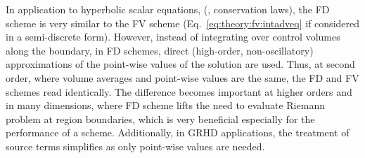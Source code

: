 %

In application to hyperbolic scalar equations, (\eg, conservation laws), the \ac{FD} scheme is very similar to the \ac{FV} scheme 
(Eq.~\eqref{eq:theory:fv:intadveq} if considered in a 
semi-discrete form).
However, instead of integrating over control volumes along the boundary, 
in \ac{FD} schemes, direct (high-order, non-oscillatory) approximations 
of the point-wise values of the solution are used.
Thus, at second order, where volume averages and point-wise values are the same,
the \ac{FD} and \ac{FV} schemes read identically.
The difference becomes important at higher orders and in many dimensions, 
where \ac{FD} scheme lifts the need to evaluate Riemann problem at region boundaries,
which is very beneficial especially for the performance of a scheme.
Additionally, in \ac{GRHD} applications, the treatment of source terms simplifies as 
only point-wise values are needed.

